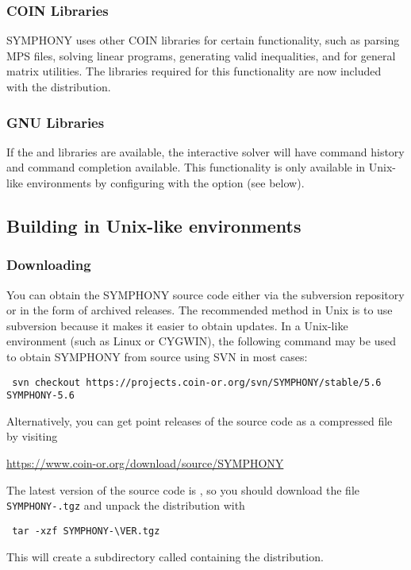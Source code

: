 \subsubsection{COIN Libraries} SYMPHONY uses other COIN libraries for certain
functionality, such as parsing MPS files, solving linear programs, generating
valid inequalities, and for general matrix utilities. The libraries required
for this functionality are now included with the distribution.

\subsubsection{GNU Libraries} If the  and  libraries
are available, the interactive solver will have command history and command
completion available. This functionality is only available in Unix-like
environments by configuring with the  option (see
below).

\subsection{Building in Unix-like environments}
\label{getting_started_unix}

\subsubsection{Downloading}

You can obtain the SYMPHONY source code either via the subversion repository
or in the form of archived releases. The recommended method in Unix is to use
subversion because it makes it easier to obtain updates. In a Unix-like
environment (such as Linux or CYGWIN), the following command may be used to
obtain SYMPHONY from source using SVN in most cases: {\color{Brown}
\begin{verbatim}
 svn checkout https://projects.coin-or.org/svn/SYMPHONY/stable/5.6 SYMPHONY-5.6
\end{verbatim}
}
Alternatively, you can get point releases of the source code as a compressed
file by visiting
\begin{center}
 \url{https://www.coin-or.org/download/source/SYMPHONY}
\end{center}
The latest version of the source code is \VER, so you should download the file
{\color{Brown}\texttt{SYMPHONY-\VER.tgz}} and unpack the distribution with 
{\color{Brown}
\begin{verbatim}
 tar -xzf SYMPHONY-\VER.tgz
\end{verbatim}
} 
This will create a subdirectory called  containing
the distribution.

